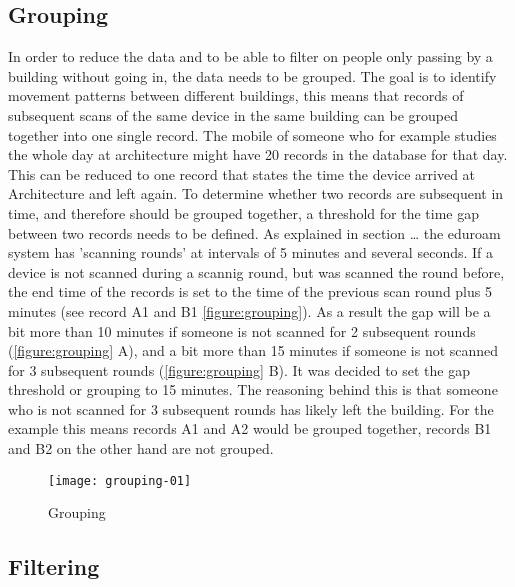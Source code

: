 \subsection{Grouping}
In order to reduce the data and to be able to filter on people only passing by a building without going in, the data needs to be grouped. The goal is to identify movement patterns between different buildings, this means that records of subsequent scans of the same device in the same building can be grouped together into one single record. The mobile of someone who for example studies the whole day at architecture might have 20 records in the database for that day. This can be reduced to one record that states the time the device arrived at Architecture and left again. To determine whether two records are subsequent in time, and therefore should be grouped together, a threshold for the time gap between two records needs to be defined. As explained in section … the eduroam system has 'scanning rounds' at intervals of 5 minutes and several seconds. If a device is not scanned during a scannig round, but was scanned the round before, the end time of the records is set to the time of the previous scan round plus 5 minutes (see record A1 and B1 \autoref{figure:grouping}). As a result the gap will be a bit more than 10 minutes if someone is not scanned for 2 subsequent rounds (\autoref{figure:grouping} A), and a bit more than 15 minutes if someone is not scanned for 3 subsequent rounds (\autoref{figure:grouping} B). It was decided to set the gap threshold or grouping to 15 minutes. The reasoning behind this is that someone who is not scanned for 3 subsequent rounds has likely left the building. For the example this means records A1 and A2 would be grouped together, records B1 and B2 on the other hand are not grouped.

\begin{figure}[H]
\centering
\texttt{[image: grouping-01]}
\captionsetup{justification=centering}
\caption{Grouping}
\label{figure:grouping}
\end{figure}

\subsection{Filtering}


